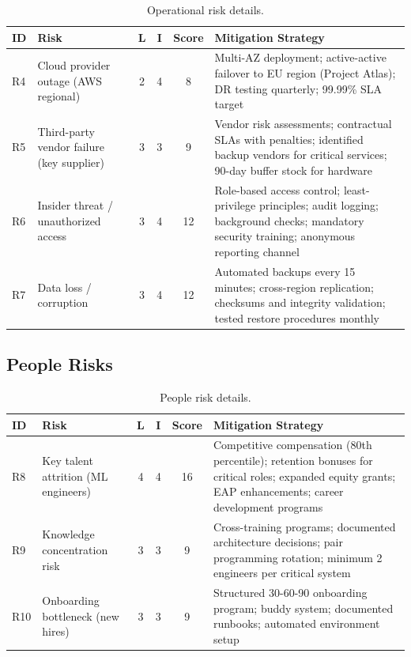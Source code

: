 \documentclass[
    language=english,
    doctype=risk-assessment,
    institution=none,
]{../../omnilatex}
\begin{document}
\begin{table}[h]
    \centering
    \small
    \begin{tabular}{llcccl}
        \toprule
        \textbf{ID} & \textbf{Risk} & \textbf{L} & \textbf{I} & \textbf{Score} & \textbf{Mitigation Strategy} \\
        \midrule
        R4 & Cloud provider outage (AWS regional) & 2 & 4 & 8 &
            Multi-AZ deployment; active-active failover to EU region
            (Project Atlas); DR testing quarterly; 99.99\% SLA target \\
        R5 & Third-party vendor failure (key supplier) & 3 & 3 & 9 &
            Vendor risk assessments; contractual SLAs with penalties;
            identified backup vendors for critical services; 90-day buffer
            stock for hardware \\
        R6 & Insider threat / unauthorized access & 3 & 4 & 12 &
            Role-based access control; least-privilege principles; audit
            logging; background checks; mandatory security training;
            anonymous reporting channel \\
        R7 & Data loss / corruption & 3 & 4 & 12 &
            Automated backups every 15 minutes; cross-region replication;
            checksums and integrity validation; tested restore procedures
            monthly \\
        \bottomrule
    \end{tabular}
    \caption{Operational risk details.}
\end{table}

\subsection{People Risks}

\begin{table}[h]
    \centering
    \small
    \begin{tabular}{llcccl}
        \toprule
        \textbf{ID} & \textbf{Risk} & \textbf{L} & \textbf{I} & \textbf{Score} & \textbf{Mitigation Strategy} \\
        \midrule
        R8 & Key talent attrition (ML engineers) & 4 & 4 & 16 &
            Competitive compensation (80th percentile); retention bonuses
            for critical roles; expanded equity grants; EAP enhancements;
            career development programs \\
        R9 & Knowledge concentration risk & 3 & 3 & 9 &
            Cross-training programs; documented architecture decisions;
            pair programming rotation; minimum 2 engineers per critical
            system \\
        R10 & Onboarding bottleneck (new hires) & 3 & 3 & 9 &
            Structured 30-60-90 onboarding program; buddy system;
            documented runbooks; automated environment setup \\
        \bottomrule
    \end{tabular}
    \caption{People risk details.}
\end{table}
\end{document}
